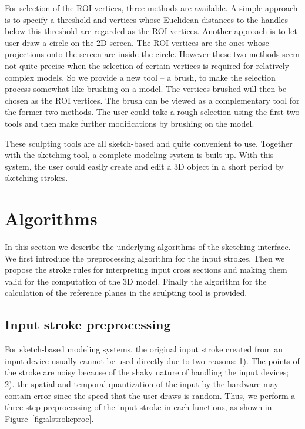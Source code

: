 For selection of the ROI vertices, three methods  are available. A
simple approach is to specify a threshold and vertices whose
Euclidean distances to the handles below this threshold are regarded
as the ROI vertices. Another approach is to let user draw a circle
on the 2D screen. The ROI vertices are the ones whose projections
onto the screen are inside the circle. However these two methods
seem not quite precise when the selection of certain vertices is
required for relatively complex models. So we provide a new tool --
a brush, to make the selection process somewhat like brushing on a
model. The vertices brushed will then be chosen as the ROI vertices.
The brush can be viewed as a complementary tool for the former two
methods. The user could take a rough selection using the first two
tools and then make further modifications by brushing on the model.

These sculpting tools are all sketch-based and quite convenient to
use. Together with the sketching tool, a complete modeling system is
built up. With this system, the user could easily create and edit a
3D object in a short period by sketching strokes.


\section{Algorithms}
\label{ch3:sec:algo}

In this section we describe the underlying algorithms of the
sketching interface. We first introduce the preprocessing algorithm
for the input strokes. Then we propose the stroke rules for
interpreting input cross sections and making them valid for the
computation of the 3D model. Finally the  algorithm for the
calculation of the reference planes in the sculpting tool is
provided.

\subsection{Input stroke preprocessing}\label{ch3:sec:alg:strokepreproc}

For sketch-based modeling systems, the original input stroke created
from an input device usually cannot be used directly due to two
reasons: 1). The points of the stroke are noisy because of the shaky
nature of handling the input devices; 2). the spatial and temporal
quantization of the input by the hardware may contain error since
the speed that the user draws is random. Thus, we perform a
three-step preprocessing of the input stroke in each functions, as
shown in Figure~\ref{fig:alstrokeproc}.

